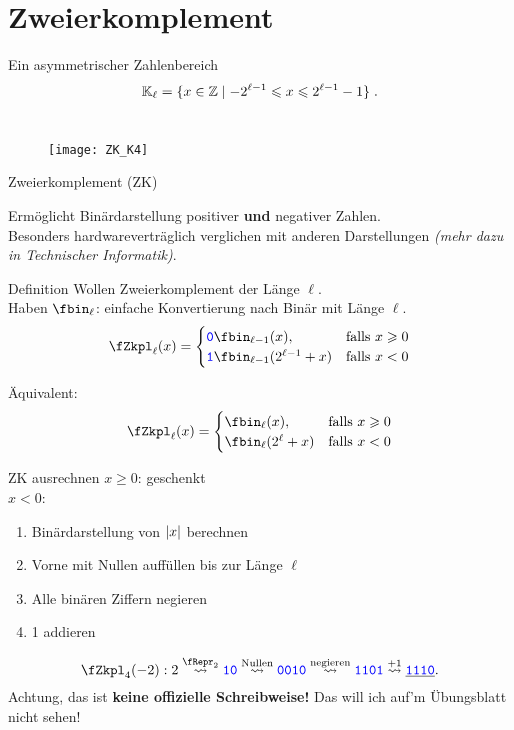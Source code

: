 \section{Zweierkomplement}

\begin{frame}{Ein asymmetrischer Zahlenbereich}
	\[
	\mathbb{K}_{\ell} = \{ x\in \mathbb{Z} \mid -2^{\ell-1} \leqslant x \leqslant 2^{\ell-1} -1 \} \;.
	\]
	\\[0.2cm]
	
	\begin{figure}
		\centering
		\texttt{[image: ZK\_K4]}
	\end{figure}
	
\end{frame}

\begin{frame}{Zweierkomplement (ZK)}
	
	Ermöglicht Binärdarstellung positiver \textbf{und} negativer Zahlen. \\
	Besonders hardwareverträglich verglichen mit anderen Darstellungen \textit{(mehr dazu in Technischer Informatik)}.

	\begin{block}{Definition}
		Wollen Zweierkomplement der Länge $\ell$. \\ Haben $\fbin_\ell$: einfache Konvertierung nach Binär mit Länge $\ell$.
		$$\fZkpl_\ell(x) = \begin{cases} \word 0 \fbin_{\ell-1}(x), & \text{falls } x \geq 0 \\ 
										 \word 1 \fbin_{\ell-1}(2^{\ell-1}+x) & \text{falls } x < 0\end{cases}$$
		
		Äquivalent:
		$$\fZkpl_\ell(x) = \begin{cases} \fbin_{\ell}(x), & \text{falls } x \geq 0 \\ 
										 \fbin_{\ell}(2^{\ell}+x) & \text{falls } x < 0\end{cases}$$
	\end{block}
\end{frame}

\begin{frame}{ZK ausrechnen}
	$x \geq 0$: geschenkt \smiley \\
	$x < 0$:
	\begin{enumerate}
		\item Binärdarstellung von $\left\lvert x \right\rvert$ berechnen
		\item Vorne mit Nullen auffüllen bis zur Länge $\ell$
		\item Alle binären Ziffern negieren
		\item 1 addieren
	\end{enumerate}
	
	\begin{Beispiel}
		 $$\fZkpl_4(-2): 2 \stackrel{\fRepr_2}{\?>} \word{10} \stackrel{\text{Nullen}}{\?>} \word{0010} \stackrel{\text{negieren}}{\?>} \word{1101} \stackrel{+1}{\?>} \underline{\word{1110}}. $$
		 Achtung, das ist \textbf{keine offizielle Schreibweise!} Das will ich auf'm Übungsblatt nicht sehen!
	\end{Beispiel}
\end{frame}

